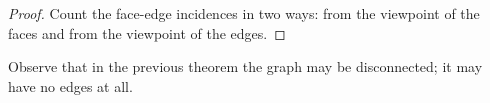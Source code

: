 

\setcounter{section}{3}
\setcounter{subsection}{2}
\setcounter{dfn}{6}

\begin{proof}
Count the face-edge incidences in two ways:
from the viewpoint of the faces and from the viewpoint of the edges.
\end{proof}
Observe that in the previous theorem the graph may be disconnected; it may have no edges at all.


